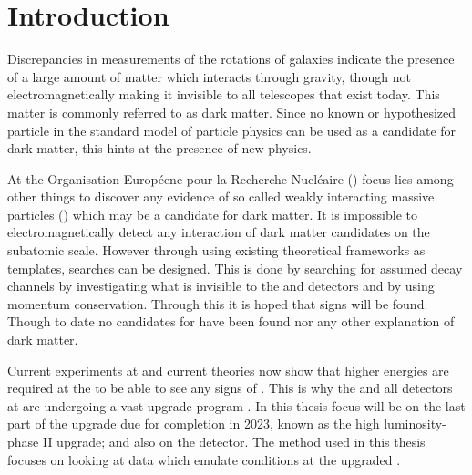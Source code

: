 \chapter{Introduction}\label{cha:intro}
Discrepancies in measurements of the rotations of galaxies indicate the presence of a large amount of matter which interacts through gravity, though not electromagnetically making it invisible to all telescopes that exist today. This matter is commonly referred to as dark matter. Since no known or hypothesized particle in the standard model of particle physics can be used as a candidate for dark matter, this hints at the presence of new physics. 

At the Organisation Européene pour la Recherche Nucléaire (\abbrCERN) focus lies among other things to discover any evidence of so called weakly interacting massive particles (\abbrWIMPS) which may be a candidate for dark matter. It is impossible to electromagnetically detect any interaction of dark matter candidates on the subatomic scale. However through using existing theoretical frameworks as templates, searches can be designed. This is done by searching for assumed decay channels by investigating what is invisible to the \abbrATLAS and \abbrCMS detectors and by using momentum conservation. Through this it is hoped that signs will be found. Though to date no candidates for \abbrWIMPS have been found nor any other explanation of dark matter. 

Current experiments at \abbrCERN and current theories now show that higher energies are required at the \abbrLHC to be able to see any signs of \abbrWIMPS . This is why the \abbrLHC and all detectors at \abbrCERN are undergoing a vast upgrade program \citep{ATLAS:LOI2}.
In this thesis focus will be on the last part of the upgrade due for completion in 2023, known as the high luminosity-\abbrLHC phase II upgrade; and also on the \abbrATLAS detector. The method used in this thesis focuses on looking at data which emulate conditions at the upgraded \abbrLHC .

\newpage
